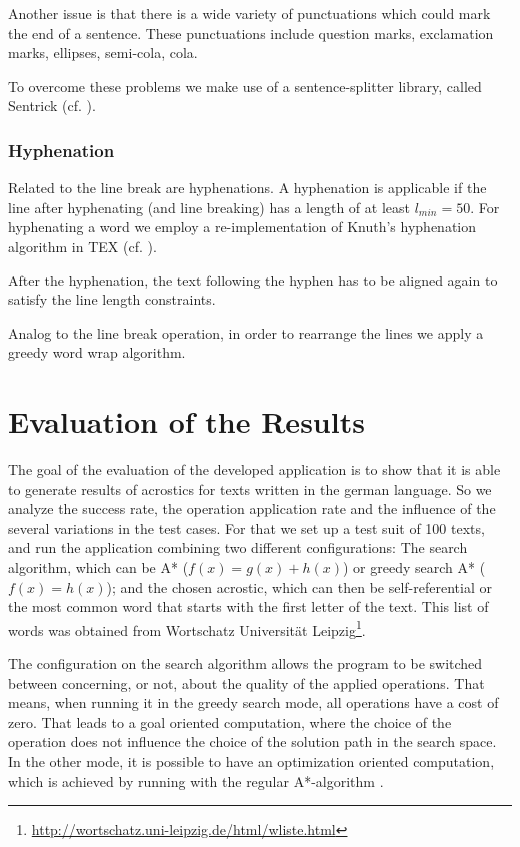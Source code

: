 \documentclass[11pt]{reportAlternative}
\begin{document}
Another issue is that there is a wide variety of punctuations which could mark the end of a sentence. These punctuations include question marks, exclamation marks, ellipses, semi-cola, cola.

To overcome these problems we make use of a sentence-splitter library, called Sentrick (cf. \cite{Sentrick}).

\subsection{Hyphenation}
Related to the line break are hyphenations. A hyphenation is applicable if the line after hyphenating (and line breaking) has a length of at least $l_{min}=50$.
For hyphenating a word we employ a re-implementation of Knuth's hyphenation algorithm in TEX (cf. \cite{Hyphenation}).

After the hyphenation, the text following the hyphen has to be aligned again to satisfy the line length constraints.

Analog to the line break operation, in order to rearrange the lines we apply a greedy word wrap algorithm.

\chapter{Evaluation of the Results}
The goal of the evaluation of the developed application is to show that it is able to generate results of acrostics for texts written in the german language. So we analyze the success rate, the operation application rate and the influence of the several variations in the test cases. For that we set up a test suit of 100 texts, and run the application combining two different configurations: The search algorithm, which can be A* ($f(x) = g(x) + h(x)$) or greedy search A* ($f(x) = h(x)$); and the chosen acrostic, which can then be self-referential or the most common word that starts with the first letter of the text. This list of words was obtained from Wortschatz Universität Leipzig\footnote{\url{http://wortschatz.uni-leipzig.de/html/wliste.html}}.

The configuration on the search algorithm allows the program to be switched between concerning, or not, about the quality of the applied operations. That means, when running it in the greedy search mode, all operations have a cost of zero. That leads to a goal oriented computation, where the choice of the operation does not influence the choice of the solution path in the search space. In the other mode, it is possible to have an optimization oriented computation, which is achieved by running with the regular A*-algorithm \cite{AStar}.
\end{document}
